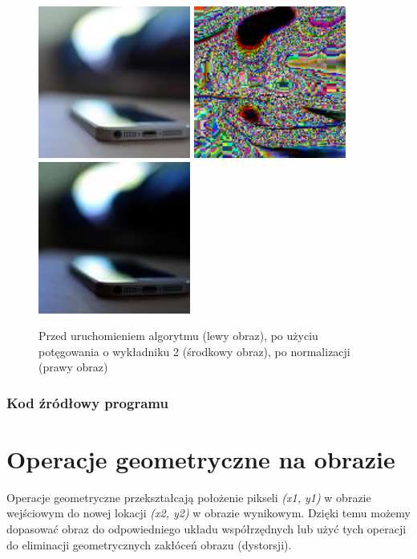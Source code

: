 \documentclass[a4paper,12pt]{book}
\begin{document}
\begin{figure}[H]
	\caption{Przed uruchomieniem algorytmu (lewy obraz), po użyciu potęgowania o wykładniku 2 (środkowy obraz), po normalizacji (prawy obraz)}
	\includegraphics[width=5cm, height=5cm]{phone-unmodified.jpg}
	\includegraphics[width=5cm, height=5cm]{3-4/power-color-phone-2.png}
	\includegraphics[width=5cm, height=5cm]{3-4/power-color-phone-2-norm.png}
\end{figure}

\subsection*{Kod źródłowy programu}

\chapter{Operacje geometryczne na obrazie}
Operacje geometryczne przekształcają położenie pikseli \textit{(x1, y1)} w obrazie wejściowym do nowej lokacji \textit{(x2, y2)} w obrazie wynikowym. Dzięki temu możemy dopasować obraz do odpowiedniego układu współrzędnych lub użyć tych operacji do eliminacji geometrycznych zakłóceń obrazu (dystorsji). 
\end{document}
